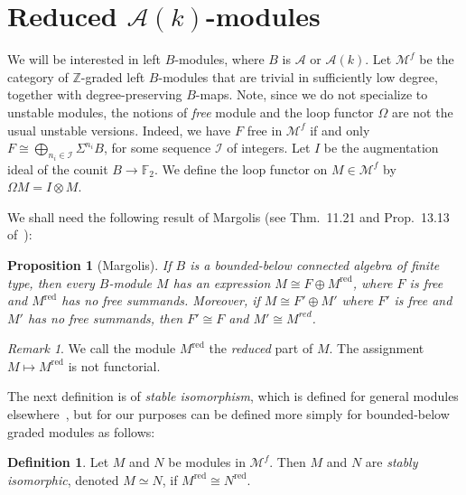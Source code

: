\documentclass{amsart}
\theoremstyle{plain}
\newtheorem{proposition}[theorem]{Proposition}
\theoremstyle{definition}
\newtheorem{definition}[theorem]{Definition}
\theoremstyle{remark}
\newtheorem{remark}[theorem]{Remark}
\begin{document}
\section{Reduced $\mathcal{A}(k)$-modules}

We will be interested in left
$B$-modules, where $B$ is $\mathcal{A}$ or $\mathcal{A}(k)$.  Let
$\mathcal{M}^f$ be the category of ${\mathbb{Z}}$-graded left $B$-modules that
are trivial in sufficiently low degree, together with
degree-preserving $B$-maps.  Note, since we do not specialize to
unstable modules, the notions of {\it free} module and the loop
functor $\Omega$ are not the usual unstable versions.  Indeed, we have
$F$ free in $\mathcal{M}^f$ if and only $F \cong \bigoplus_{n_i\in
  \mathscr{I}} \Sigma^{n_i} B$, for some sequence $\mathscr{I}$ of
integers.  Let $I$ be the augmentation ideal of the counit $B \to
{\mathbb{F}}_2$.  We define the loop functor on $M \in \mathcal{M}^f$ by $\Omega
M = I \otimes M$.

We shall need the following result of Margolis (see Thm.~11.21 and
Prop.~13.13 of~\cite{Margolis}):
\begin{proposition}[Margolis]
  If $B$ is a bounded-below connected algebra of finite type, then
  every $B$-module $M$ has an expression $M \cong F \oplus
  M^{\mathrm{red}}$, where $F$ is free and $M^{\mathrm{red}}$ has no
  free summands.  Moreover, if $M \cong F' \oplus M'$ where $F'$ is
  free and $M'$ has no free summands, then $F' \cong F$ and $M' \cong
  M^{red}$.
\end{proposition}
\begin{remark}
  We call the module $M^{\mathrm{red}}$ the {\it reduced} part of $M$.
  The assignment $M \mapsto M^{\mathrm{red}}$ is not functorial.
\end{remark}
The next definition is of {\it stable isomorphism}, which is defined
for general modules elsewhere~\cite{Margolis, Bruner}, but for our
purposes can be defined more simply for bounded-below graded modules
as follows:
\begin{definition}
  Let $M$ and $N$ be modules in $\mathcal{M}^f$.  Then $M$ and $N$ are
  {\it stably isomorphic}, denoted $M \simeq N$, if $M^{\mathrm{red}}
  \cong N^{\mathrm{red}}$.
\end{definition}
\end{document}
